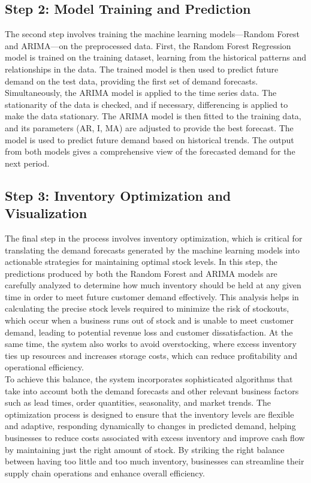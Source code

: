 \documentclass[10pt]{report}
\begin{document}
\begin{center}
\subsection{Step 2: Model Training and Prediction}
The second step involves training the machine learning models—Random Forest and ARIMA—on the preprocessed data. First, the Random Forest Regression model is trained on the training dataset, learning from the historical patterns and relationships in the data. The trained model is then used to predict future demand on the test data, providing the first set of demand forecasts. Simultaneously, the ARIMA model is applied to the time series data. The stationarity of the data is checked, and if necessary, differencing is applied to make the data stationary. The ARIMA model is then fitted to the training data, and its parameters (AR, I, MA) are adjusted to provide the best forecast. The model is used to predict future demand based on historical trends. The output from both models gives a comprehensive view of the forecasted demand for the next period.

\subsection{Step 3: Inventory Optimization and Visualization}
The final step in the process involves inventory optimization, which is critical for translating the demand forecasts generated by the machine learning models into actionable strategies for maintaining optimal stock levels. In this step, the predictions produced by both the Random Forest and ARIMA models are carefully analyzed to determine how much inventory should be held at any given time in order to meet future customer demand effectively. This analysis helps in calculating the precise stock levels required to minimize the risk of stockouts, which occur when a business runs out of stock and is unable to meet customer demand, leading to potential revenue loss and customer dissatisfaction. At the same time, the system also works to avoid overstocking, where excess inventory ties up resources and increases storage costs, which can reduce profitability and operational efficiency.\\

To achieve this balance, the system incorporates sophisticated algorithms that take into account both the demand forecasts and other relevant business factors such as lead times, order quantities, seasonality, and market trends. The optimization process is designed to ensure that the inventory levels are flexible and adaptive, responding dynamically to changes in predicted demand, helping businesses to reduce costs associated with excess inventory and improve cash flow by maintaining just the right amount of stock. By striking the right balance between having too little and too much inventory, businesses can streamline their supply chain operations and enhance overall efficiency.\\


\end{center}
\end{document}
